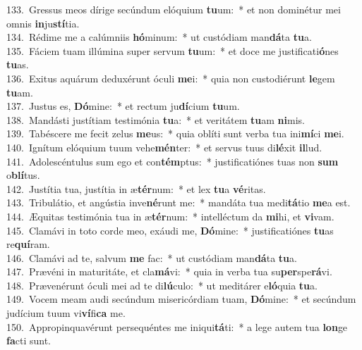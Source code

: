 {133.~}Gressus meos dírige secúndum elóquium \textbf{tu}um:~* et non dominétur mei omnis \textbf{in}ju\textbf{stí}tia.\\
{134.~}Rédime me a calúmniis \textbf{hó}minum:~* ut custódiam man\textbf{dá}ta \textbf{tu}a.\\
{135.~}Fáciem tuam illúmina super servum \textbf{tu}um:~* et doce me justificati\textbf{ó}nes \textbf{tu}as.\\
{136.~}Exitus aquárum deduxérunt óculi \textbf{me}i:~* quia non custodiérunt \textbf{le}gem \textbf{tu}am.\\
{137.~}Justus es, \textbf{Dó}mine:~* et rectum ju\textbf{dí}cium \textbf{tu}um.\\
{138.~}Mandásti justítiam testimónia \textbf{tu}a:~* et veritátem \textbf{tu}am \textbf{ni}mis.\\
{139.~}Tabéscere me fecit zelus \textbf{me}us:~* quia oblíti sunt verba tua ini\textbf{mí}ci \textbf{me}i.\\
{140.~}Ignítum elóquium tuum vehe\textbf{mén}ter:~* et servus tuus di\textbf{lé}xit \textbf{il}lud.\\
{141.~}Adolescéntulus sum ego et con\textbf{tém}ptus:~* justificatiónes tuas non \textbf{sum} o\textbf{blí}tus.\\
{142.~}Justítia tua, justítia in æ\textbf{tér}num:~* et lex \textbf{tu}a \textbf{vé}ritas.\\
{143.~}Tribulátio, et angústia inve\textbf{né}runt me:~* mandáta tua medi\textbf{tá}tio \textbf{me}a est.\\
{144.~}Æquitas testimónia tua in æ\textbf{tér}num:~* intelléctum da \textbf{mi}hi, et \textbf{vi}vam.\\
{145.~}Clamávi in toto corde meo, exáudi me, \textbf{Dó}mine:~* justificatiónes \textbf{tu}as re\textbf{quí}ram.\\
{146.~}Clamávi ad te, salvum \textbf{me} fac:~* ut custódiam man\textbf{dá}ta \textbf{tu}a.\\
{147.~}Prævéni in maturitáte, et cla\textbf{má}vi:~* quia in verba tua su\textbf{per}spe\textbf{rá}vi.\\
{148.~}Prævenérunt óculi mei ad te di\textbf{lú}culo:~* ut meditárer e\textbf{ló}quia \textbf{tu}a.\\
{149.~}Vocem meam audi secúndum misericórdiam tuam, \textbf{Dó}mine:~* et secúndum judícium tuum vi\textbf{ví}fi\textbf{ca} me.\\
{150.~}Appropinquavérunt persequéntes me iniqui\textbf{tá}ti:~* a lege autem tua \textbf{lon}ge \textbf{fa}cti sunt.\\
